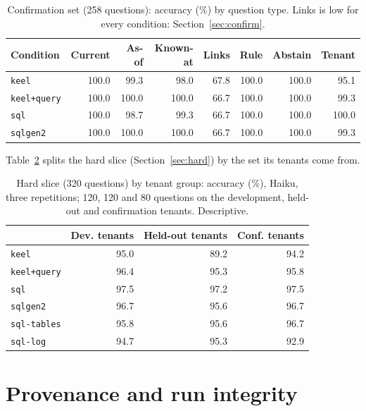 \documentclass[sigconf, nonacm]{acmart}
\newcommand{\code}[1]{\texttt{#1}}
\begin{document}
\begin{table}[t]
\caption{Confirmation set (258 questions): accuracy (\%) by question type. Links is low for every condition: Section~\ref{sec:confirm}.}
\label{tab:confirm-types}
\centering
\footnotesize
\begin{tabular}{l r r r r r r r }
\toprule
Condition & Current & As-of & Known-at & Links & Rule & Abstain & Tenant \\
\midrule
\code{keel} & 100.0 & 99.3 & 98.0 & 67.8 & 100.0 & 100.0 & 95.1 \\
\code{keel+query} & 100.0 & 100.0 & 100.0 & 66.7 & 100.0 & 100.0 & 99.3 \\
\code{sql} & 100.0 & 98.7 & 99.3 & 66.7 & 100.0 & 100.0 & 100.0 \\
\code{sqlgen2} & 100.0 & 100.0 & 100.0 & 66.7 & 100.0 & 100.0 & 99.3 \\
\bottomrule
\end{tabular}
\end{table}

Table~\ref{tab:hard-sets} splits the hard slice (Section~\ref{sec:hard}) by the set its tenants come from.

\begin{table}[t]
\caption{Hard slice (320 questions) by tenant group: accuracy (\%), Haiku, three repetitions; 120, 120 and 80 questions on the development, held-out and confirmation tenants. Descriptive.}
\label{tab:hard-sets}
\centering
\footnotesize
\setlength{\tabcolsep}{3pt}
\begin{tabular}{l r r r}
\toprule
 & Dev. tenants & Held-out tenants & Conf. tenants \\
\midrule
\code{keel} & 95.0 & 89.2 & 94.2 \\
\code{keel+query} & 96.4 & 95.3 & 95.8 \\
\code{sql} & 97.5 & 97.2 & 97.5 \\
\code{sqlgen2} & 96.7 & 95.6 & 96.7 \\
\code{sql-tables} & 95.8 & 95.6 & 96.7 \\
\code{sql-log} & 94.7 & 95.3 & 92.9 \\
\bottomrule
\end{tabular}
\end{table}




\section{Provenance and run integrity}
\label{app:provenance}
\setcounter{table}{0}
\end{document}
